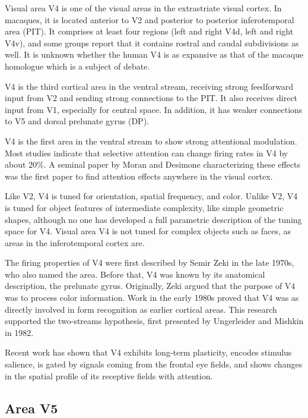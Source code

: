 Visual area V4 is one of the visual areas in the extrastriate visual cortex. In macaques, it is located anterior to V2 and posterior to posterior inferotemporal area (PIT). It comprises at least four regions (left and right V4d, left and right V4v), and some groups report that it contains rostral and caudal subdivisions as well. It is unknown whether the human V4 is as expansive as that of the macaque homologue which is a subject of debate.

V4 is the third cortical area in the ventral stream, receiving strong feedforward input from V2 and sending strong connections to the PIT. It also receives direct input from V1, especially for central space. In addition, it has weaker connections to V5 and dorsal prelunate gyrus (DP).

V4 is the first area in the ventral stream to show strong attentional modulation. Most studies indicate that selective attention can change firing rates in V4 by about 20\%. A seminal paper by Moran and Desimone characterizing these effects was the first paper to find attention effects anywhere in the visual cortex.

Like V2, V4 is tuned for orientation, spatial frequency, and color. Unlike V2, V4 is tuned for object features of intermediate complexity, like simple geometric shapes, although no one has developed a full parametric description of the tuning space for V4. Visual area V4 is not tuned for complex objects such as faces, as areas in the inferotemporal cortex are.

The firing properties of V4 were first described by Semir Zeki in the late 1970s, who also named the area. Before that, V4 was known by its anatomical description, the prelunate gyrus. Originally, Zeki argued that the purpose of V4 was to process color information. Work in the early 1980s proved that V4 was as directly involved in form recognition as earlier cortical areas. This research supported the two-streams hypothesis, first presented by Ungerleider and Mishkin in 1982.

Recent work has shown that V4 exhibits long-term plasticity, encodes stimulus salience, is gated by signals coming from the frontal eye fields, and shows changes in the spatial profile of its receptive fields with attention.

\hypertarget{area-v5}{%
\subsection{Area V5}\label{area-v5}}


